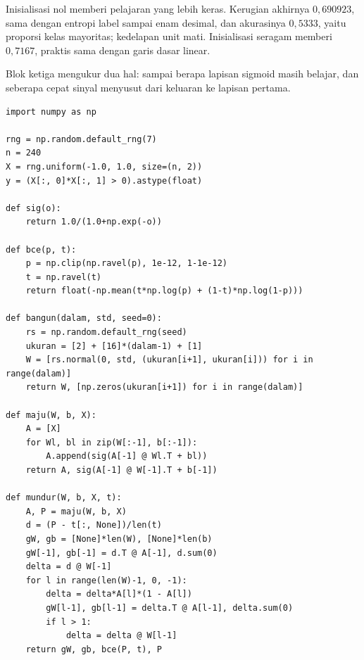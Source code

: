 Inisialisasi nol memberi pelajaran yang lebih keras. Kerugian akhirnya $0{,}690923$, sama dengan entropi label sampai enam desimal, dan akurasinya $0{,}5333$, yaitu proporsi kelas mayoritas; kedelapan unit mati. Inisialisasi seragam memberi $0{,}7167$, praktis sama dengan garis dasar linear.

Blok ketiga mengukur dua hal: sampai berapa lapisan sigmoid masih belajar, dan seberapa cepat sinyal menyusut dari keluaran ke lapisan pertama.

\begin{lab}
\begin{verbatim}
import numpy as np

rng = np.random.default_rng(7)
n = 240
X = rng.uniform(-1.0, 1.0, size=(n, 2))
y = (X[:, 0]*X[:, 1] > 0).astype(float)

def sig(o):
    return 1.0/(1.0+np.exp(-o))

def bce(p, t):
    p = np.clip(np.ravel(p), 1e-12, 1-1e-12)
    t = np.ravel(t)
    return float(-np.mean(t*np.log(p) + (1-t)*np.log(1-p)))

def bangun(dalam, std, seed=0):
    rs = np.random.default_rng(seed)
    ukuran = [2] + [16]*(dalam-1) + [1]
    W = [rs.normal(0, std, (ukuran[i+1], ukuran[i])) for i in range(dalam)]
    return W, [np.zeros(ukuran[i+1]) for i in range(dalam)]

def maju(W, b, X):
    A = [X]
    for Wl, bl in zip(W[:-1], b[:-1]):
        A.append(sig(A[-1] @ Wl.T + bl))
    return A, sig(A[-1] @ W[-1].T + b[-1])

def mundur(W, b, X, t):
    A, P = maju(W, b, X)
    d = (P - t[:, None])/len(t)
    gW, gb = [None]*len(W), [None]*len(b)
    gW[-1], gb[-1] = d.T @ A[-1], d.sum(0)
    delta = d @ W[-1]
    for l in range(len(W)-1, 0, -1):
        delta = delta*A[l]*(1 - A[l])
        gW[l-1], gb[l-1] = delta.T @ A[l-1], delta.sum(0)
        if l > 1:
            delta = delta @ W[l-1]
    return gW, gb, bce(P, t), P


\end{verbatim}
\end{lab}
